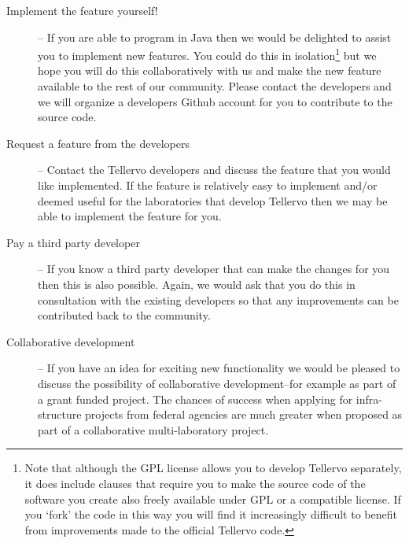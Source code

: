 \begin{description}
 \item[Implement the feature yourself!] -- If you are able to program in Java then we would be delighted to assist you to implement new features.  You could do this in isolation\footnote{Note that although the GPL license allows you to develop Tellervo separately, it does include clauses that require you to make the source code of the software you create also freely available under GPL or a compatible license. If you `fork' the code in this way you will find it increasingly difficult to benefit from improvements made to the official Tellervo code.} but we hope you will do this collaboratively with us and make the new feature available to the rest of our community.  Please contact the developers and we will organize a developers Github account for you to contribute to the source code.
 \item[Request a feature from the developers] -- Contact the Tellervo developers and discuss the feature that you would like implemented.  If the feature is relatively easy to implement and/or deemed useful for the laboratories that develop Tellervo then we may be able to implement the feature for you.
 \item[Pay a third party developer] -- If you know a third party developer that can make the changes for you then this is also possible.  Again, we would ask that you do this in consultation with the existing developers so that any improvements can be contributed back to the community.
 \item[Collaborative development] -- If you have an idea for exciting new functionality we would be pleased to discuss the possibility of collaborative development--for example as part of a grant funded project.  The chances of success when applying for infra-structure projects from federal agencies are much greater when proposed as part of a collaborative multi-laboratory project.
\end{description}



